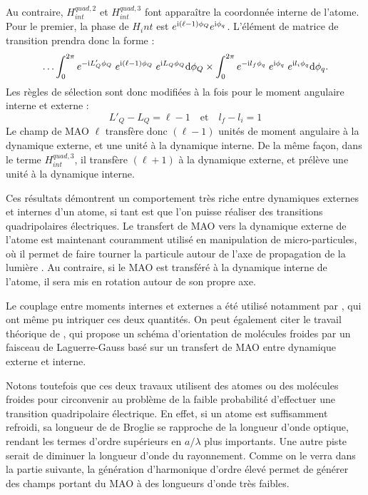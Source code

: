 Au contraire, $H^{quad,2}_{int}$ et $H^{quad,3}_{int}$ font apparaître la coordonnée interne de l'atome. Pour le premier, la phase de $H_int$ est $e^{\mathrm{i}(\ell-1)\phi_Q}e^{\mathrm{i} \phi_q}$. L'élément de matrice de transition prendra donc la forme :
\begin{equation}
\ldots\int_{0}^{2\pi} e^{-\mathrm{i} L'_Q\phi_Q}\;e^{\mathrm{i}(\ell-1)\phi_Q}\;e^{\mathrm{i} L_Q\phi_Q} \mathrm{d}\phi_Q \times 
\int_{0}^{2\pi} e^{-\mathrm{i} l_f \phi_q}\;e^{\mathrm{i}\phi_q}\;e^{\mathrm{i} l_i\phi_q} \mathrm{d}\phi_q.
\end{equation}
Les règles de sélection sont donc modifiées à la fois pour le moment angulaire interne et externe :
\begin{equation}
L'_Q-L_Q=\ell-1 \quad\text{et}\quad l_f-l_i = 1
\end{equation}
Le champ de MAO $\ell$ transfère donc $(\ell-1)$ unités de moment angulaire à la dynamique externe, et une unité à la dynamique interne. De la même façon, dans le terme $H^{quad,3}_{int}$, il transfère $(\ell+1)$ à la dynamique externe, et prélève une unité à la dynamique interne.

Ces résultats démontrent un comportement très riche entre dynamiques externes et internes d'un atome, si tant est que l'on puisse réaliser des transitions quadripolaires électriques. Le transfert de MAO vers la dynamique externe de l'atome est maintenant couramment utilisé en manipulation de micro-particules, où il permet de faire tourner la particule autour de l'axe de propagation de la lumière . Au contraire, si le MAO est transféré à la dynamique interne de l'atome, il sera mis en rotation autour de son propre axe.\par
Le couplage entre moments internes et externes a été utilisé notamment par , qui ont même pu intriquer ces deux quantités. On peut également citer le travail théorique de , qui propose un schéma d'orientation de molécules froides par un faisceau de Laguerre-Gauss basé sur un transfert de MAO entre dynamique externe et interne.

Notons toutefois que ces deux travaux utilisent des atomes ou des molécules froides pour circonvenir au problème de la faible probabilité d'effectuer une transition quadripolaire électrique. En effet, si un atome est suffisamment refroidi, sa longueur de de Broglie se rapproche de la longueur d'onde optique, rendant les termes d'ordre supérieurs en $a/\lambda$ plus importants.  Une autre piste serait de diminuer la longueur d'onde du rayonnement. Comme on le verra dans la partie suivante, la génération d'harmonique d'ordre élevé permet de générer des champs portant du MAO à des longueurs d'onde très faibles.%

